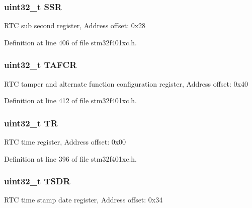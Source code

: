 \subsubsection[{\texorpdfstring{S\+SR}{SSR}}]{ uint32\+\_\+t S\+SR}\hypertarget{struct_r_t_c___type_def_a8a868e5e76b52ced04c536be3dee08ec}{}\label{struct_r_t_c___type_def_a8a868e5e76b52ced04c536be3dee08ec}
R\+TC sub second register, Address offset\+: 0x28 

Definition at line 406 of file stm32f401xc.\+h.

\subsubsection[{\texorpdfstring{T\+A\+F\+CR}{TAFCR}}]{ uint32\+\_\+t T\+A\+F\+CR}\hypertarget{struct_r_t_c___type_def_a14d03244a7fda1d94b51ae9ed144ca12}{}\label{struct_r_t_c___type_def_a14d03244a7fda1d94b51ae9ed144ca12}
R\+TC tamper and alternate function configuration register, Address offset\+: 0x40 

Definition at line 412 of file stm32f401xc.\+h.

\subsubsection[{\texorpdfstring{TR}{TR}}]{ uint32\+\_\+t TR}\hypertarget{struct_r_t_c___type_def_a63d179b7a36a715dce7203858d3be132}{}\label{struct_r_t_c___type_def_a63d179b7a36a715dce7203858d3be132}
R\+TC time register, Address offset\+: 0x00 

Definition at line 396 of file stm32f401xc.\+h.

\subsubsection[{\texorpdfstring{T\+S\+DR}{TSDR}}]{ uint32\+\_\+t T\+S\+DR}\hypertarget{struct_r_t_c___type_def_abeb6fb580a8fd128182aa9ba2738ac2c}{}\label{struct_r_t_c___type_def_abeb6fb580a8fd128182aa9ba2738ac2c}
R\+TC time stamp date register, Address offset\+: 0x34 

